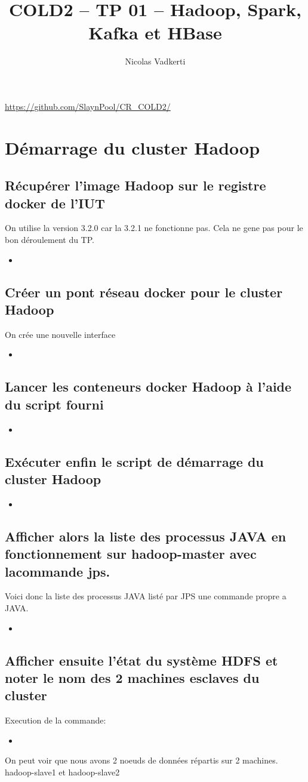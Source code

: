 \documentclass[10pt,a4paper]{article}
\title{COLD2 – TP 01 – Hadoop, Spark, Kafka et HBase}
\author{Nicolas Vadkerti}
\newcommand{\insertcode}[2]{\begin{itemize}\item[]\end{itemize}}
\begin{document}
\maketitle


\url{https://github.com/SlaynPool/CR_COLD2/}
\section{Démarrage du cluster Hadoop}
\subsection{Récupérer l’image Hadoop sur le registre docker de l’IUT}
On utilise la version 3.2.0 car la 3.2.1 ne fonctionne pas. Cela ne gene pas pour le bon déroulement du TP.
\insertcode{commande/1.txt}{Docker Pull}

\subsection{Créer un pont réseau docker pour le cluster Hadoop}
On crée une nouvelle interface
 \insertcode{commande/2.txt}{Docker network}
\subsection{Lancer les conteneurs docker Hadoop à l’aide du script fourni} 
\insertcode{commande/3.txt}{Creation des conteneurs}
\subsection{Exécuter enfin le script de démarrage du cluster Hadoop}
\insertcode{commande/4.txt}{Démarrage du CLuster}
\subsection{Afficher   alors   la   liste   des   processus   JAVA   en   fonctionnement   sur  hadoop-master  avec   lacommande jps.}
Voici donc la liste des processus JAVA listé par JPS une commande propre a JAVA.
\insertcode{commande/5.txt}{Processus Java}
\subsection{Afficher ensuite l’état du système HDFS et noter le nom des 2 machines esclaves du cluster}
Execution de la commande:
\insertcode{commande/6.txt}{HDFS}
On peut voir que nous avons 2 noeuds de données répartis sur 2 machines. hadoop-slave1 et hadoop-slave2
\end{document}
